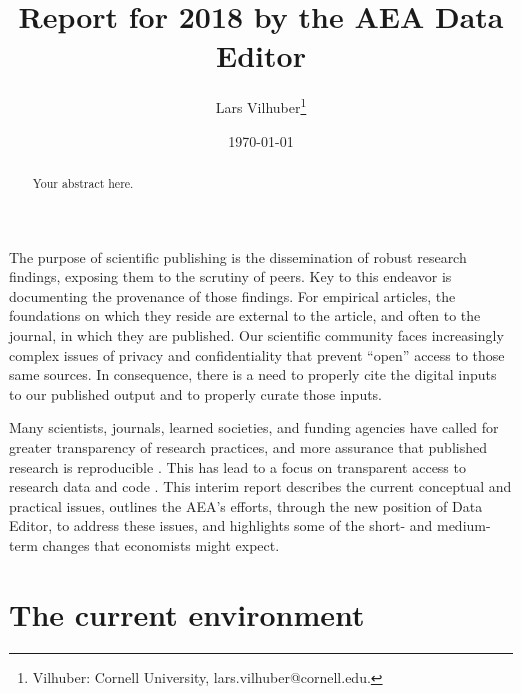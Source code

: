 \documentclass[AEJ]{AEA}
\begin{document}
\title{Report for 2018 by the AEA Data Editor }
\author{Lars Vilhuber\thanks{%
Vilhuber: Cornell University, lars.vilhuber@cornell.edu.}}
\date{\today}
\JEL{}
\Keywords{}

\begin{abstract}
Your abstract here.
\end{abstract}

\maketitle
The purpose of scientific publishing is the dissemination of robust research findings, exposing them to the scrutiny of peers. Key to this endeavor is documenting the provenance of those findings. For empirical articles, the foundations on which they reside are external to the article, and often to the journal, in which they are published. Our scientific community faces  increasingly complex issues of privacy and confidentiality that prevent ``open'' access to those same sources. In consequence, there is a need to properly cite the digital inputs to our published output and to properly curate those inputs.  

Many scientists,  journals, learned societies, and funding agencies have called for greater transparency of research practices, and more assurance that published research is reproducible \citep{Stodden2016-uc,Fuentes2016-wz,Moffitt2016-wl,Camerer2016-kl,Bollen2015-vb,Joskow2015-hd}. This has lead to a focus on transparent access to research data and code \citep{Coffman2017-si,Hoeffler2017-aa,Duvendack2017-js,Hamermesh2017-kq}. This interim report describes the current conceptual and practical issues, outlines the \ac{AEA}'s efforts, through the new position of Data Editor,  to address these issues, and highlights some of the short- and medium-term changes that economists might expect. 


\section{The current environment}
\end{document}
